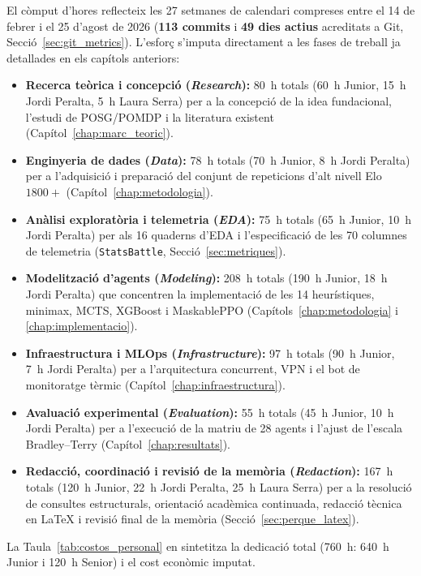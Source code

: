 El còmput d'hores reflecteix les 27 setmanes de calendari compreses entre el 14 de febrer i el 25 d'agost de 2026 (\textbf{113 commits} i \textbf{49 dies actius} acreditats a Git, Secció~\ref{sec:git_metrics}). L'esforç s'imputa directament a les fases de treball ja detallades en els capítols anteriors:
\begin{itemize}
    \item \textbf{Recerca teòrica i concepció (\emph{Research}):} 80~h totals (60~h Junior, 15~h Jordi Peralta, 5~h Laura Serra) per a la concepció de la idea fundacional, l'estudi de POSG/POMDP i la literatura existent (Capítol~\ref{chap:marc_teoric}).
    \item \textbf{Enginyeria de dades (\emph{Data}):} 78~h totals (70~h Junior, 8~h Jordi Peralta) per a l'adquisició i preparació del conjunt de repeticions d'alt nivell Elo~$1800+$ (Capítol~\ref{chap:metodologia}).
    \item \textbf{Anàlisi exploratòria i telemetria (\emph{EDA}):} 75~h totals (65~h Junior, 10~h Jordi Peralta) per als 16 quaderns d'EDA i l'especificació de les 70 columnes de telemetria (\texttt{StatsBattle}, Secció~\ref{sec:metriques}).
    \item \textbf{Modelització d'agents (\emph{Modeling}):} 208~h totals (190~h Junior, 18~h Jordi Peralta) que concentren la implementació de les 14 heurístiques, minimax, MCTS, XGBoost i MaskablePPO (Capítols~\ref{chap:metodologia} i \ref{chap:implementacio}).
    \item \textbf{Infraestructura i MLOps (\emph{Infrastructure}):} 97~h totals (90~h Junior, 7~h Jordi Peralta) per a l'arquitectura concurrent, VPN i el bot de monitoratge tèrmic (Capítol~\ref{chap:infraestructura}).
    \item \textbf{Avaluació experimental (\emph{Evaluation}):} 55~h totals (45~h Junior, 10~h Jordi Peralta) per a l'execució de la matriu de 28 agents i l'ajust de l'escala Bradley--Terry (Capítol~\ref{chap:resultats}).
    \item \textbf{Redacció, coordinació i revisió de la memòria (\emph{Redaction}):} 167~h totals (120~h Junior, 22~h Jordi Peralta, 25~h Laura Serra) per a la resolució de consultes estructurals, orientació acadèmica continuada, redacció tècnica en \LaTeX{} i revisió final de la memòria (Secció~\ref{sec:perque_latex}).
\end{itemize}

La Taula~\ref{tab:costos_personal} en sintetitza la dedicació total (760~h: 640~h Junior i 120~h Senior) i el cost econòmic imputat.

